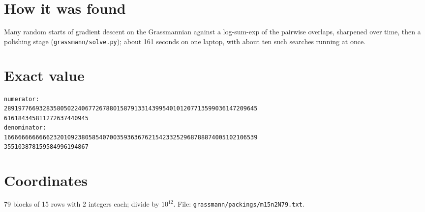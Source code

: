 \documentclass[11pt,a4paper]{article}
\begin{document}
\section{How it was found}
Many random starts of gradient descent on the Grassmannian against a log-sum-exp of the pairwise overlaps, sharpened over time, then a polishing stage (\texttt{grassmann/solve.py}); about 161 seconds on one laptop, with about ten such searches running at once.


\appendix
\section{Exact value}
{\small
\begin{verbatim}
numerator:
289197766932835805022406772678801587913314399540101207713599036147209645
616184345811272637440945
denominator:
166666666666623201092380585407003593636762154233252968788874005102106539
355103878159584996194867
\end{verbatim}}

\section{Coordinates}
79 blocks of 15 rows with 2 integers each; divide by $10^{12}$. File: \texttt{grassmann/packings/m15n2N79.txt}.
{\tiny
\begin{multicols}{4}
\end{multicols}}
\end{document}
